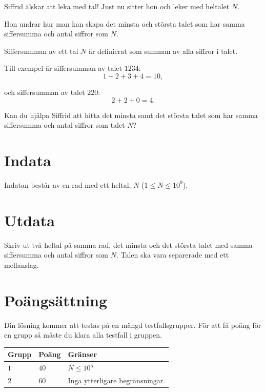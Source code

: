 \noindent
Siffrid älskar att leka med tal! Just nu sitter hon och leker med heltalet $N$.

Hon undrar hur man kan skapa det minsta och största talet som har samma siffersumma och antal siffror som $N$.

Siffersumman av ett tal $N$ är definierat som summan av alla siffror i talet. 

\noindent
Till exempel är siffersumman av talet $1234$: 
$$
1 + 2 + 3 + 4 = 10,
$$

och siffersumman av talet $220$:
$$
2 + 2 + 0 = 4.
$$

Kan du hjälpa Siffrid att hitta det minsta samt det största talet som har samma siffersumma och antal siffror som talet $N$?

\section*{Indata}
Indatan består av en rad med ett heltal, $N$ ($1 \le N \le 10^9$).

\section*{Utdata}
Skriv ut två heltal på samma rad, det minsta och det största talet med samma siffersumma och antal siffror som $N$.
Talen ska vara separerade med ett mellanslag.

\section*{Poängsättning}
Din lösning kommer att testas på en mängd testfallsgrupper.
För att få poäng för en grupp så måste du klara alla testfall i gruppen.

\noindent
\begin{tabular}{| l | l | p{12cm} |}
  \hline
  \textbf{Grupp} & \textbf{Poäng} & \textbf{Gränser} \\ \hline
  $1$    & $40$       & $N \leq 10^5$ \\ \hline
  $2$    & $60$       & Inga ytterligare begränsningar. \\ \hline
\end{tabular}

